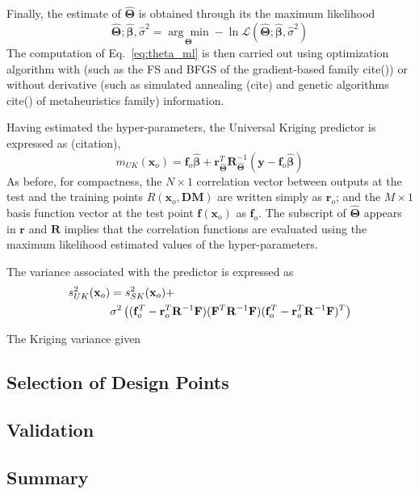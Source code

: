 Finally, the estimate of $\hat{\boldsymbol{\Theta}}$ is obtained through its the maximum likelihood
\begin{equation}
	\hat{\boldsymbol{\Theta}} ; \hat{\boldsymbol{\beta}}, \hat{\sigma}^2 = \underset{\boldsymbol{\Theta}}{\arg\min} - \ln \mathcal{L} (\hat{\boldsymbol{\Theta}};\hat{\boldsymbol{\beta}}, \hat{\sigma}^2)
\label{eq:theta_ml}
\end{equation}
The computation of Eq.~\ref{eq:theta_ml} is then carried out using optimization algorithm with (such as the FS and BFGS of the gradient-based family cite()) or without derivative (such as simulated annealing (cite) and genetic algorithms cite() of metaheuristics family) information.

Having estimated the hyper-parameters, the Universal Kriging predictor is expressed as (citation),
\begin{equation}
	m_{UK}(\mathbf{x}_o) = \mathbf{f}_o \hat{\boldsymbol{\beta}} + \mathbf{r}^T_{\hat{\boldsymbol{\Theta}}} \mathbf{R}^{-1}_{\hat{\boldsymbol{\Theta}}} (\mathbf{y} - \mathbf{f}_o \hat{\boldsymbol{\beta}})
\label{eq:uk_predictor}
\end{equation}
As before, for compactness, the $N \times 1$ correlation vector between outputs at the test and the training points $R(\mathbf{x}_o, \mathbf{DM})$ are written simply as $\mathbf{r}_o$;
and the $M \times 1$ basis function vector at the test point $\mathbf{f}(\mathbf{x}_o)$ as $\mathbf{f}_o$.
The subscript of $\hat{\boldsymbol{\Theta}}$ appears in $\mathbf{r}$ and $\mathbf{R}$ implies that the correlation functions are evaluated using the maximum likelihood estimated values of the hyper-parameters.

The variance associated with the predictor is expressed as
\begin{equation}
	\begin{split}
		s^2_{UK}(\mathbf{x}_o) & = s^2_{SK} (\mathbf{x}_o) + \\
			& \medskip \medskip \sigma^2 \left((\mathbf{f}_o^T - \mathbf{r}^T_o \mathbf{R}^{-1} \mathbf{F}) (\mathbf{F}^T \mathbf{R}^{-1} \mathbf{F}) (\mathbf{f}_o^T - \mathbf{r}^T_o \mathbf{R}^{-1} \mathbf{F})^T \right) 
	\end{split}
\label{eq:uk_variance}
\end{equation}

The Kriging variance given


\subsection{Selection of Design Points}\label{sub:gp_design}

\subsection{Validation}\label{sub:gp_validation}

\subsection{Summary}\label{sub:gp_summary}